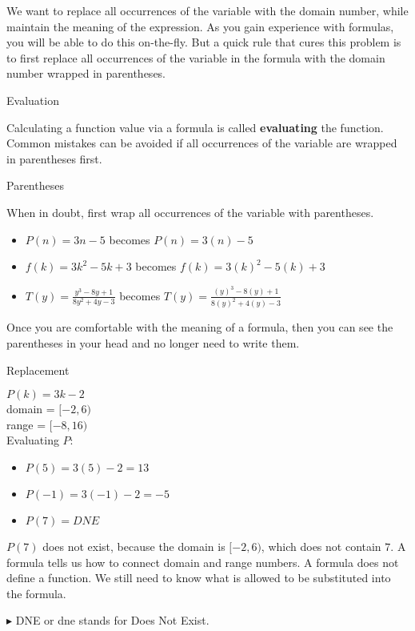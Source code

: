 \documentclass{ximera}
\begin{document}
We want to replace all occurrences of the variable with the domain number, while maintain the meaning of the expression.  As you gain experience with formulas, you will be able to do this on-the-fly.  But a quick rule that cures this problem is to first replace all occurrences of the variable in the formula with the domain number wrapped in parentheses.


\begin{procedure} Evaluation 

Calculating a function value via a formula is called \textbf{evaluating} the function.  Common mistakes can be avoided if all occurrences of the variable are wrapped in parentheses first.
\end{procedure}



\begin{example}   Parentheses 

When in doubt, first wrap all occurrences of the variable with parentheses.
\begin{itemize}
\item $P(n) = 3n - 5$ becomes $P(n) = 3(n) - 5$ \\

\item $f(k) = 3k^2 - 5k + 3$ becomes $f(k) = 3(k)^2 - 5(k) + 3$ \\

\item $T(y) = \frac{y^3 - 8y + 1}{8y^2 + 4y - 3}$ becomes $T(y) = \frac{(y)^3 - 8(y) + 1}{8(y)^2 + 4(y) - 3}$
\end{itemize}

\end{example}

Once you are comfortable with the meaning of a formula, then you can see the parentheses in your head and no longer need to write them.










  
\begin{procedure}   Replacement 

$P(k) = 3k - 2$ \\
domain = $[-2, 6)$ \\
range = $[-8, 16)$ \\

Evaluating $P$:
\begin{itemize}
\item $P(5) = 3(5) - 2 = 13$
\item $P(-1) = 3(-1) - 2 = -5$
\item $P(7) = DNE$
\end{itemize}


$P(7)$ does not exist, because the domain is $[-2, 6)$, which does not contain $7$.  A formula tells us how to connect domain and range numbers.  A formula does not define a function.  We still need to know what is allowed to be substituted into the formula.

\end{procedure}
$\blacktriangleright$ DNE or dne stands for Does Not Exist. 
\end{document}
